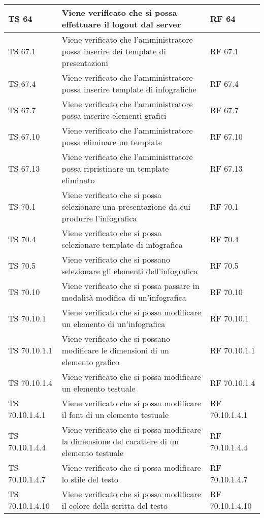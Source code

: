 {{\begin{longtable} [c]{| p{3cm} | p{6cm} |p{3cm}|}
			\hline
			TS 64 & Viene verificato che si possa effettuare il logout\ped{g} dal server\ped{g} & RF 64\\
			\hline
			TS 67.1 & Viene verificato che l'amministratore possa inserire dei template\ped{g} di presentazioni & RF 67.1\\
			\hline
			TS 67.4 & Viene verificato che l'amministratore possa inserire template\ped{g} di infografiche\ped{g} & RF 67.4\\
			\hline
			TS 67.7 & Viene verificato che l'amministratore possa inserire elementi grafici & RF 67.7\\
			\hline
			TS 67.10 & Viene verificato che l'amministratore possa eliminare un template\ped{g} & RF 67.10\\
			\hline
			TS 67.13 & Viene verificato che l'amministratore possa ripristinare un template eliminato & RF 67.13\\
			\hline
			TS 70.1 & Viene verificato che si possa selezionare una presentazione da cui produrre l'infografica\ped{g}  & RF 70.1\\
			\hline
			TS 70.4 & Viene verificato che si possa selezionare template\ped{g} di infografica\ped{g} & RF 70.4\\
			\hline
			TS 70.5 & Viene verificato che si possano selezionare gli elementi dell'infografica  & RF 70.5\\
			\hline
			TS 70.10 & Viene verificato che si possa passare in modalità modifica di un'infografica\ped{g} & RF 70.10\\
			\hline
			TS 70.10.1 & Viene verificato che si possa modificare un elemento di un'infografica\ped{g} & RF 70.10.1\\
			\hline
			TS 70.10.1.1 & Viene verificato che si possano modificare le dimensioni di un elemento grafico & RF 70.10.1.1\\
			\hline
			TS 70.10.1.4 & Viene verificato che si possa modificare un elemento testuale  & RF 70.10.1.4\\
			\hline
			TS 70.10.1.4.1 & Viene verificato che si possa modificare il font\ped{g} di un elemento testuale & RF 70.10.1.4.1\\
			\hline
			TS 70.10.1.4.4 & Viene verificato che si possa modificare la dimensione del carattere di un elemento testuale & RF 70.10.1.4.4\\
			\hline
			TS 70.10.1.4.7 & Viene verificato che si possa modificare lo stile del testo & RF 70.10.1.4.7\\
			\hline
			TS 70.10.1.4.10 & Viene verificato che si possa modificare il colore della scritta del testo & RF 70.10.1.4.10\\

\end{longtable}}}
